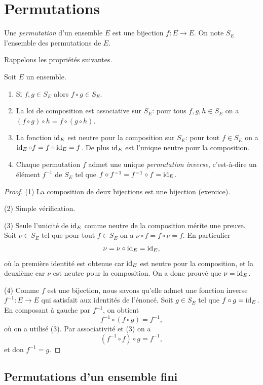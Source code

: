 \documentclass[french,course,oneside,theoremnosection]{lecture}
\begin{document}
\section{Permutations}
\begin{definition}
Une \emph{permutation} d'un ensemble $E$ est une bijection $f\colon E \to E$. On note $S_E$ l'ensemble des permutations de $E$.
\end{definition}
Rappelons les propriétés suivantes.
\begin{proposition}Soit $E$ un ensemble.
\begin{enumerate}[(1)]
\item Si $f, g \in S_E$ alors  $f\circ g \in S_E$.
\item La loi de composition est associative sur $S_E$: pour tous $f,g,h\in S_E$ on a $(f \circ g) \circ h = f \circ (g \circ h)$.
\item La fonction $\operatorname{id}_E$ est neutre pour la composition sur $S_E$: pour tout $f\in S_E$ on a $\operatorname{id}_E \circ f=f \circ \operatorname{id}_E=f$. De plus $\operatorname{id}_E$ est l'unique neutre pour la composition.
\item Chaque permutation $f$ admet une unique \emph{permutation inverse}, c'est-à-dire un élément $f^{-1}$ de $S_E$ tel que
$f \circ f^{-1}=f^{-1}\circ f=\operatorname{id}_E$.
\end{enumerate}
\end{proposition}
\begin{proof}
(1) La composition de deux bijections est une bijection (exercice).

(2) Simple vérification.

(3) Seule l'unicité de $\operatorname{id}_E$ comme neutre de la composition mérite une preuve. Soit $\nu \in S_E$ tel que pour tout $f \in S_E$ on a $\nu \circ f = f \circ \nu = f$. En particulier \[\nu=\nu \circ \operatorname{id}_E=\operatorname{id}_E,\]
où la  première identité est obtenue car $\operatorname{id}_E$ est neutre pour la composition, et la deuxième car $\nu$ est neutre pour la composition. On a donc prouvé que $\nu=\operatorname{id}_E$.

(4) Comme $f$ est une bijection, nous savons qu'elle admet une fonction inverse $f^{-1}:E \to E$ qui satisfait aux identités de l'énoncé. Soit $g\in S_E$ tel que $f\circ g=\operatorname{id}_E$. En composant à gauche par $f^{-1}$, on obtient
\[
f^{-1} \circ (f\circ g)= f^{-1},
\]
où on a utilisé (3). Par associativité et (3) on a 
\[
(f^{-1} \circ f) \circ g = f^{-1},
\]
et don $f^{-1}=g$.
\end{proof}
\subsection{Permutations d'un ensemble fini}
\end{document}
